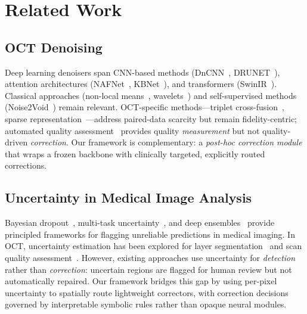 \documentclass{ieeetj}
\begin{document}
\section{Related Work}
\label{sec:related}

\subsection{OCT Denoising}
Deep learning denoisers span CNN-based methods (DnCNN~\cite{zhang2017beyond}, DRUNET~\cite{devalla2018drunet}), attention architectures (NAFNet~\cite{chen2022simple}, KBNet~\cite{zhang2023kbnet}), and transformers (SwinIR~\cite{liang2021swinir}). Classical approaches (non-local means~\cite{buades2005non}, wavelets~\cite{mayer2012wavelet}) and self-supervised methods (Noise2Void~\cite{krull2019noise2void}) remain relevant. OCT-specific methods---triplet cross-fusion~\cite{geng2022triplet}, sparse representation~\cite{fang2012sparsity,fang2013fast}---address paired-data scarcity but remain fidelity-centric; automated quality assessment~\cite{wang2019quality} provides quality \emph{measurement} but not quality-driven \emph{correction}. Our framework is complementary: a \emph{post-hoc correction module} that wraps a frozen backbone with clinically targeted, explicitly routed corrections.

\subsection{Uncertainty in Medical Image Analysis}
Bayesian dropout~\cite{gal2016dropout}, multi-task uncertainty~\cite{kendall2018multi}, and deep ensembles~\cite{lakshminarayanan2017simple} provide principled frameworks for flagging unreliable predictions in medical imaging. In OCT, uncertainty estimation has been explored for layer segmentation~\cite{devalla2018drunet} and scan quality assessment~\cite{wang2019quality}. However, existing approaches use uncertainty for \emph{detection} rather than \emph{correction}: uncertain regions are flagged for human review but not automatically repaired. Our framework bridges this gap by using per-pixel uncertainty to spatially route lightweight correctors, with correction decisions governed by interpretable symbolic rules rather than opaque neural modules.
\end{document}
